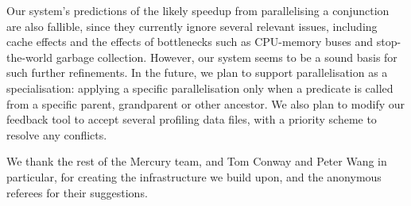 Our system's predictions of the likely speedup from parallelising a conjunction
are also fallible, since they currently ignore several relevant issues,
including cache effects
and the effects of bottlenecks
such as CPU-memory buses and stop-the-world garbage collection.
However, our system seems to be a sound basis for such further refinements.
In the future, we plan to support parallelisation as a specialisation:
applying a specific parallelisation only when a predicate is called
from a specific parent, grandparent or other ancestor.
We also plan to modify our feedback tool
to accept several profiling data files,
with a priority scheme to resolve any conflicts.

We thank the rest of the Mercury team,
and Tom Conway and Peter Wang in particular,
for creating the infrastructure we build upon,
and the anonymous referees for their suggestions.



\newpage

